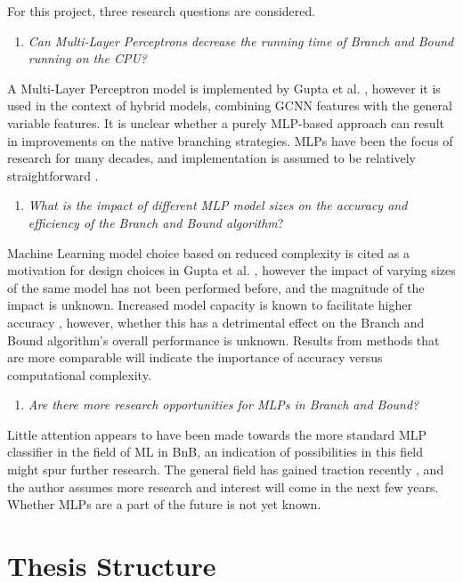 For this project, three research questions are considered.
%
\begin{enumerate}[label=(\roman*)]
    \item \textit{Can Multi-Layer Perceptrons decrease the running time of Branch and Bound running on the \Gls{CPU}?}
\end{enumerate}
%
A Multi-Layer Perceptron model is implemented by Gupta et al. \cite{gupta2020hybrid}, however it is used in the context of hybrid models, combining \Gls{GCNN} features with the general variable features. It is unclear whether a purely \gls{MLP}-based approach can result in improvements on the native branching strategies. \gls{MLP}s have been the focus of research for many decades, and implementation is assumed to be relatively straightforward \cite{goodfellow2016deep}.
%
\begin{enumerate}[resume*]
    \item \textit{What is the impact of different \gls{MLP} model sizes on the accuracy and efficiency of the Branch and Bound algorithm}?
\end{enumerate}
%
Machine Learning model choice based on reduced complexity is cited as a motivation for design choices in Gupta et al. \cite{gupta2020hybrid}, however the impact of varying sizes of the same model has not been performed before, and the magnitude of the impact is unknown. Increased model capacity is known to facilitate higher accuracy \cite{goodfellow2016deep}, however, whether this has a detrimental effect on the Branch and Bound algorithm's overall performance is unknown. Results from methods that are more comparable will indicate the importance of accuracy versus computational complexity.   
%
\begin{enumerate}[resume*]
    \item \textit{Are there more research opportunities for \gls{MLP}s in Branch and Bound?}
\end{enumerate}
%
Little attention appears to have been made towards the more standard \Gls{MLP} classifier in the field of \Gls{ML} in \Gls{BnB}, an indication of possibilities in this field might spur further research. The general field has gained traction recently \cite{bengio2020machine}, and the author assumes more research and interest will come in the next few years. Whether \Gls{MLP}s are a part of the future is not yet known. 



\section{Thesis Structure}

